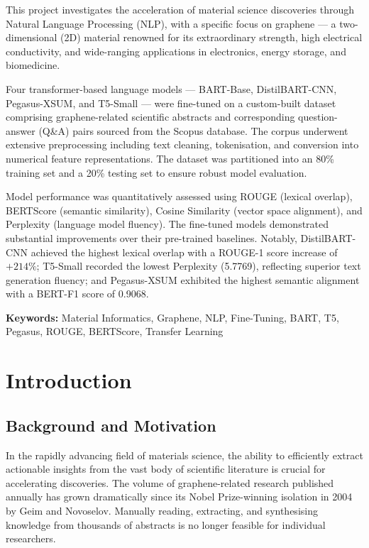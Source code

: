 \documentclass[12pt, a4paper]{report}
\begin{document}
This project investigates the acceleration of material science discoveries through Natural Language Processing (NLP), with a specific focus on graphene --- a two-dimensional (2D) material renowned for its extraordinary strength, high electrical conductivity, and wide-ranging applications in electronics, energy storage, and biomedicine.

Four transformer-based language models --- BART-Base, DistilBART-CNN, Pegasus-XSUM, and T5-Small --- were fine-tuned on a custom-built dataset comprising graphene-related scientific abstracts and corresponding question-answer (Q\&A) pairs sourced from the Scopus database. The corpus underwent extensive preprocessing including text cleaning, tokenisation, and conversion into numerical feature representations. The dataset was partitioned into an 80\% training set and a 20\% testing set to ensure robust model evaluation.

Model performance was quantitatively assessed using ROUGE (lexical overlap), BERTScore (semantic similarity), Cosine Similarity (vector space alignment), and Perplexity (language model fluency). The fine-tuned models demonstrated substantial improvements over their pre-trained baselines. Notably, DistilBART-CNN achieved the highest lexical overlap with a ROUGE-1 score increase of $+214\%$; T5-Small recorded the lowest Perplexity (5.7769), reflecting superior text generation fluency; and Pegasus-XSUM exhibited the highest semantic alignment with a BERT-F1 score of 0.9068.

\vspace{1em}
\textbf{Keywords:} Material Informatics, Graphene, NLP, Fine-Tuning, BART, T5, Pegasus, ROUGE, BERTScore, Transfer Learning

\tableofcontents
\listoffigures
\listoftables
\newpage

\chapter{Introduction}

\section{Background and Motivation}

In the rapidly advancing field of materials science, the ability to efficiently extract actionable insights from the vast body of scientific literature is crucial for accelerating discoveries. The volume of graphene-related research published annually has grown dramatically since its Nobel Prize-winning isolation in 2004 by Geim and Novoselov. Manually reading, extracting, and synthesising knowledge from thousands of abstracts is no longer feasible for individual researchers.
\end{document}
